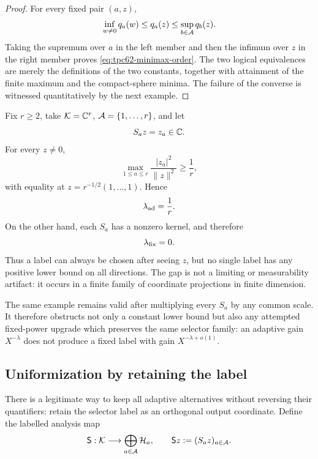 \begin{proof}
For every fixed pair \((a,z)\),
\[
 \inf_{w\ne0}q_a(w)\le q_a(z)
 \le\sup_{b\in\mathcal A}q_b(z).
\]
Taking the supremum over \(a\) in the left member and then the infimum
over \(z\) in the right member proves
\eqref{eq:tpc62-minimax-order}.  The two logical equivalences are merely
the definitions of the two constants, together with attainment of the
finite maximum and the compact-sphere minima.  The failure of the converse
is witnessed quantitatively by the next example.
\end{proof}

\begin{example}
\label{ex:tpc62-coordinate-selector-gap}
Fix \(r\ge2\), take \(\mathcal K=\mathbb C^r\), \(\mathcal A=\{1,\ldots,r\}\), and let
\[
 S_a z=z_a\in\mathbb C.
\]
For every \(z\ne0\),
\[
 \max_{1\le a\le r}\frac{|z_a|^2}{\|z\|^2}\ge\frac1r,
\]
with equality at \(z=r^{-1/2}(1,\ldots,1)\).  Hence
\begin{equation}
 \lambda_{\rm ad}=\frac1r.
 \label{eq:tpc62-coordinate-adaptive}
\end{equation}
On the other hand, each \(S_a\) has a nonzero kernel, and therefore
\begin{equation}
 \lambda_{\rm fix}=0.
 \label{eq:tpc62-coordinate-fixed}
\end{equation}
Thus a label can always be chosen after seeing \(z\), but no single label
has any positive lower bound on all directions.  The gap is not a limiting
or measurability artifact: it occurs in a finite family of coordinate
projections in finite dimension.
\end{example}

The same example remains valid after multiplying every \(S_a\) by any
common scale.  It therefore obstructs not only a constant lower bound but
also any attempted fixed-power upgrade which preserves the same selector
family: an adaptive gain \(X^{-\lambda}\) does not produce a fixed label
with gain \(X^{-\lambda+o(1)}\).

\subsection{Uniformization by retaining the label}

There is a legitimate way to keep all adaptive alternatives without
reversing their quantifiers: retain the selector label as an orthogonal
output coordinate.  Define the labelled analysis map
\begin{equation}
 \mathsf S:\mathcal K\longrightarrow
 \bigoplus_{a\in\mathcal A}\mathcal H_a,
 \qquad
 \mathsf Sz:=(S_az)_{a\in\mathcal A}.
 \label{eq:tpc62-labelled-analysis-map}
\end{equation}


